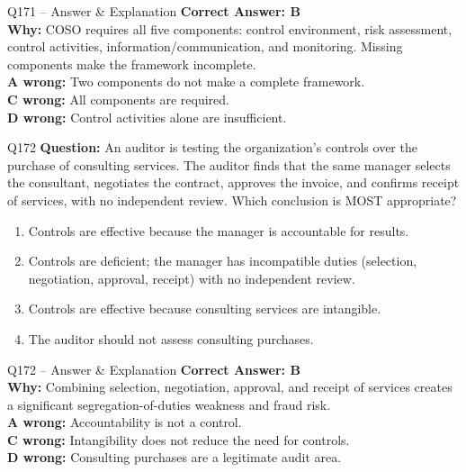 \documentclass[aspectratio=169,10pt]{beamer}
\begin{document}
	\begin{frame}[t]{Q171 -- Answer \& Explanation}
		\small
		\textbf{Correct Answer: B} \\[4pt]
		\textbf{Why:} COSO requires all five components: control environment, risk assessment, control activities, information/communication, and monitoring. Missing components make the framework incomplete. \\[4pt]
		\textbf{A wrong:} Two components do not make a complete framework. \\[2pt]
		\textbf{C wrong:} All components are required. \\[2pt]
		\textbf{D wrong:} Control activities alone are insufficient.
	\end{frame}
	
	\begin{frame}[t]{Q172}
		\small
		\textbf{Question:} An auditor is testing the organization's controls over the purchase of consulting services. The auditor finds that the same manager selects the consultant, negotiates the contract, approves the invoice, and confirms receipt of services, with no independent review. Which conclusion is MOST appropriate?
		\begin{enumerate}[label=\Alph*.,itemsep=1pt,topsep=2pt]
			\item Controls are effective because the manager is accountable for results.
			\item Controls are deficient; the manager has incompatible duties (selection, negotiation, approval, receipt) with no independent review.
			\item Controls are effective because consulting services are intangible.
			\item The auditor should not assess consulting purchases.
		\end{enumerate}
	\end{frame}
	
	\begin{frame}[t]{Q172 -- Answer \& Explanation}
		\small
		\textbf{Correct Answer: B} \\[4pt]
		\textbf{Why:} Combining selection, negotiation, approval, and receipt of services creates a significant segregation-of-duties weakness and fraud risk. \\[4pt]
		\textbf{A wrong:} Accountability is not a control. \\[2pt]
		\textbf{C wrong:} Intangibility does not reduce the need for controls. \\[2pt]
		\textbf{D wrong:} Consulting purchases are a legitimate audit area.
	\end{frame}
	
\end{document}
